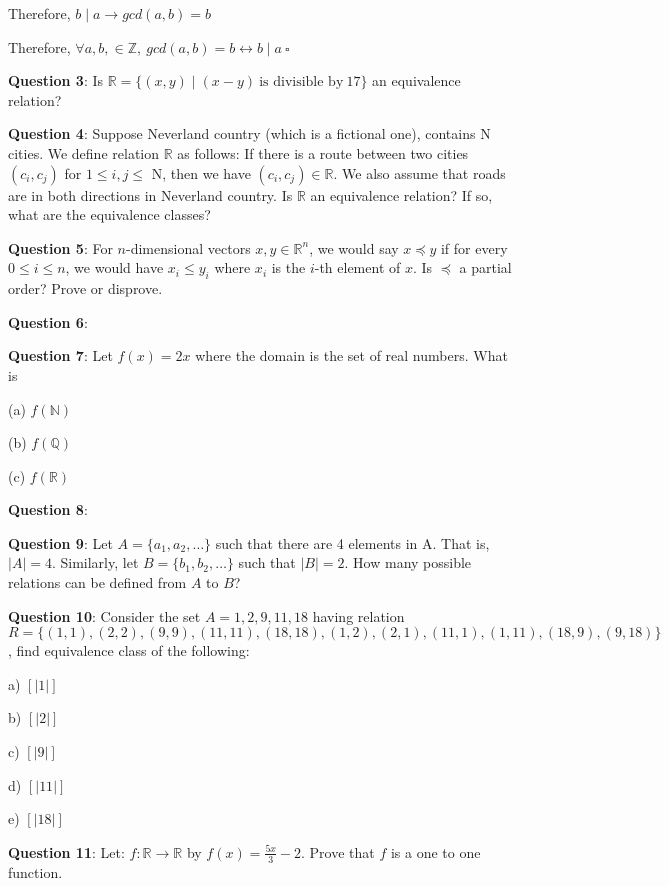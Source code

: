 \documentclass{article} %
\newcommand{\question}[2][]{\begin{flushleft}
        \textbf{Question #1}: #2
\end{flushleft}}
\begin{document}
    \tabto{1cm} Therefore, $b \mid a \rightarrow gcd(a, b) = b$

    Therefore, $\forall a, b, \in \mathbb{Z}, \ gcd(a, b) = b \leftrightarrow b \mid a\ \square$

    \question[3]{Is $\mathbb{R} = \{(x, y) \mid (x - y)\ \text{is divisible by}\ 17\}$ an equivalence relation?}

    

    \question[4]{Suppose Neverland country (which is a fictional one), contains N cities. We define 
    relation $\mathbb{R}$ as follows: If there is a route between two cities $(c_i, c_j)$ for $1 \leq i, j \leq$ N, then we have
    $(c_i, c_j) \in \mathbb{R}$. We also assume that roads are in both directions in Neverland country. Is $\mathbb{R}$ an 
    equivalence relation? If so, what are the equivalence classes?}

    \question[5]{For $n$-dimensional vectors $x, y \in \mathbb{R}^n$, we would say $x \preceq y$ if for every $0 \leq i \leq n$, we
    would have $x_i \leq y_i$ where $x_i$ is the $i$-th element of $x$. Is $\preceq$ a partial order? Prove or disprove.}

    \question[6]{}

    \question[7]{Let $f(x) = 2x$ where the domain is the set of real numbers. What is}

    (a) $f(\mathbb{N})$

    (b) $f(\mathbb{Q})$

    (c) $f(\mathbb{R})$

    \question[8]{}

    \question[9]{Let $A = \{a_1, a_2, \ldots \}$ such that there are 4 elements in A. That is, $|A| = 4$. Similarly,
    let $B = \{b_1, b_2, \ldots \}$ such that $|B| = 2$. How many possible relations can be defined from $A$ to $B$?}

    \question[10]{Consider the set $A = {1, 2, 9, 11, 18}$ having relation
    $R = \{(1, 1), (2, 2), (9, 9), (11, 11), (18, 18), (1, 2), (2, 1), (11, 1), (1, 11), (18, 9), (9, 18) \}$, find 
    equivalence class of the following:}

    a) $[|1|]$

    b) $[|2|]$

    c) $[|9|]$

    d) $[|11|]$

    e) $[|18|]$

    \question[11]{Let: $f: \mathbb{R} \rightarrow \mathbb{R}$ by $f(x) = \frac{5x}{3} - 2$. Prove that $f$ is a one to one function.}
\end{document}
